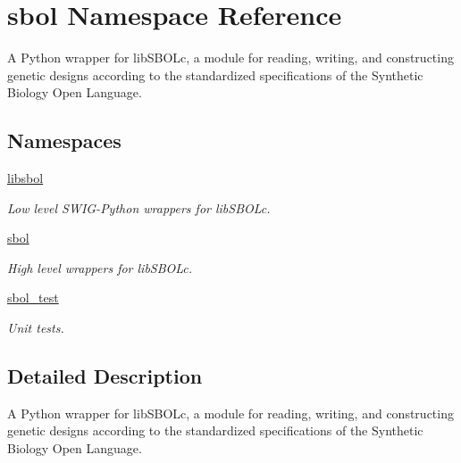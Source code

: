 \hypertarget{namespacesbol}{}\section{sbol Namespace Reference}
\label{namespacesbol}


A Python wrapper for lib\+S\+B\+O\+Lc, a module for reading, writing, and constructing genetic designs according to the standardized specifications of the Synthetic Biology Open Language.  


\subsection*{Namespaces}
\begin{DoxyCompactItemize}
\item 
 \hyperlink{namespacesbol_1_1libsbol}{libsbol}
\begin{DoxyCompactList}\small\item\em Low level S\+W\+I\+G-\/\+Python wrappers for lib\+S\+B\+O\+Lc. \end{DoxyCompactList}\item 
 \hyperlink{namespacesbol_1_1sbol}{sbol}
\begin{DoxyCompactList}\small\item\em High level wrappers for lib\+S\+B\+O\+Lc. \end{DoxyCompactList}\item 
 \hyperlink{namespacesbol_1_1sbol__test}{sbol\+\_\+test}
\begin{DoxyCompactList}\small\item\em Unit tests. \end{DoxyCompactList}\end{DoxyCompactItemize}


\subsection{Detailed Description}
A Python wrapper for lib\+S\+B\+O\+Lc, a module for reading, writing, and constructing genetic designs according to the standardized specifications of the Synthetic Biology Open Language. 
